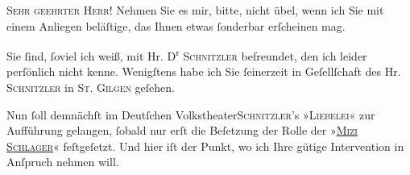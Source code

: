 \pstart{}\textsc{Sehr geehrter Herr!}\pend\vspace{0.5em}
\pstart
           Nehmen Sie es mir, bitte, nicht übel, wenn ich Sie mit einem Anliegen beläſtige, das
               Ihnen etwas ſonderbar erſcheinen mag.\pend
           
\pstart
           Sie ſind, ſoviel ich weiß, mit Hr. D\textsuperscript{r}{ }\textsc{Schnitzler} befreundet, den ich leider perſönlich nicht
               kenne. Wenigſtens habe ich Sie ſeinerzeit in Geſellſchaft des Hr. \textsc{Schnitzler} in \textsc{St. Gilgen} geſehen.\pend
           
\pstart
           Nun ſoll demnächſt im Deutſchen Volkstheater\textsc{Schnitzler}’s »\textsc{Liebelei}« zur Aufführung ge{\pb}langen,
               ſobald nur erſt die Beſetzung der Rolle der »\textsc{\uline{Mizi Schlager}}« feſtgeſetzt. Und hier iſt der Punkt, wo ich Ihre gütige Intervention in
               Anſpruch nehmen will.\pend
           

